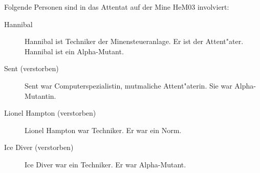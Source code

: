 
Folgende Personen sind in das Attentat auf der Mine HeM03 involviert:

\begin{description}
    \item[Hannibal] Hannibal ist Techniker der Minensteueranlage. Er ist der Attent"ater. Hannibal ist ein Alpha-Mutant.
    \item[Sent (verstorben)] Sent war Computerspezialistin, mutma\3liche Attent"aterin. Sie war Alpha-Mutantin. 
    \item[Lionel Hampton (verstorben)] Lionel Hampton war Techniker. Er war ein Norm. 
    \item[Ice Diver (verstorben)] Ice Diver war ein Techniker. Er war Alpha-Mutant. 
\end{description}
